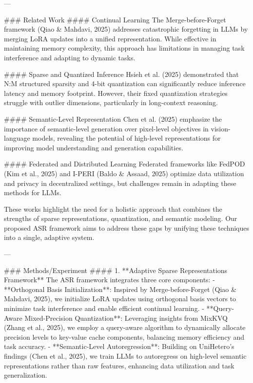 ---

### Related Work  
#### Continual Learning  
The Merge-before-Forget framework (Qiao & Mahdavi, 2025) addresses catastrophic forgetting in LLMs by merging LoRA updates into a unified representation. While effective in maintaining memory complexity, this approach has limitations in managing task interference and adapting to dynamic tasks.

#### Sparse and Quantized Inference  
Hsieh et al. (2025) demonstrated that N:M structured sparsity and 4-bit quantization can significantly reduce inference latency and memory footprint. However, their fixed quantization strategies struggle with outlier dimensions, particularly in long-context reasoning.

#### Semantic-Level Representation  
Chen et al. (2025) emphasize the importance of semantic-level generation over pixel-level objectives in vision-language models, revealing the potential of high-level representations for improving model understanding and generation capabilities.

#### Federated and Distributed Learning  
Federated frameworks like FedPOD (Kim et al., 2025) and I-PERI (Baldo & Assaad, 2025) optimize data utilization and privacy in decentralized settings, but challenges remain in adapting these methods for LLMs.

These works highlight the need for a holistic approach that combines the strengths of sparse representations, quantization, and semantic modeling. Our proposed ASR framework aims to address these gaps by unifying these techniques into a single, adaptive system.

---

### Methods/Experiment  
#### 1. **Adaptive Sparse Representations Framework**  
The ASR framework integrates three core components:  
- **Orthogonal Basis Initialization**: Inspired by Merge-before-Forget (Qiao & Mahdavi, 2025), we initialize LoRA updates using orthogonal basis vectors to minimize task interference and enable efficient continual learning.  
- **Query-Aware Mixed-Precision Quantization**: Leveraging insights from MixKVQ (Zhang et al., 2025), we employ a query-aware algorithm to dynamically allocate precision levels to key-value cache components, balancing memory efficiency and task accuracy.  
- **Semantic-Level Autoregression**: Building on UniHetero's findings (Chen et al., 2025), we train LLMs to autoregress on high-level semantic representations rather than raw features, enhancing data utilization and task generalization.


